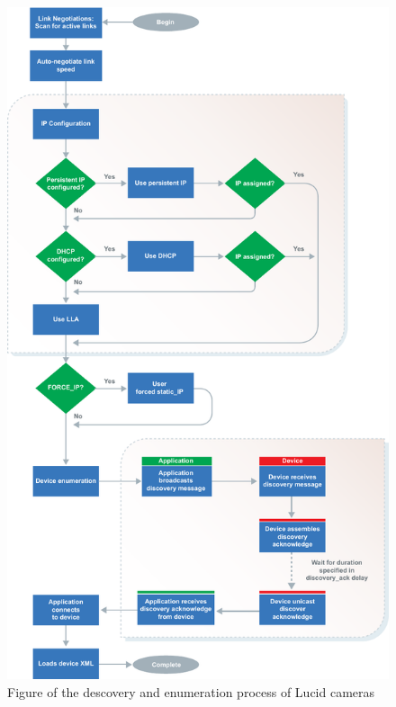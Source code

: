 \begin{figure}[H]
    \centering
    \includegraphics[height=\textheight]{figures/PDF/lucid_ip_discovery.pdf}
    \caption{Figure of the descovery and enumeration process of Lucid cameras \cite{lucidvisionlabsTritonMPPolarized2020}}
    \label{fig:lucid_ip_discovery}
\end{figure}


